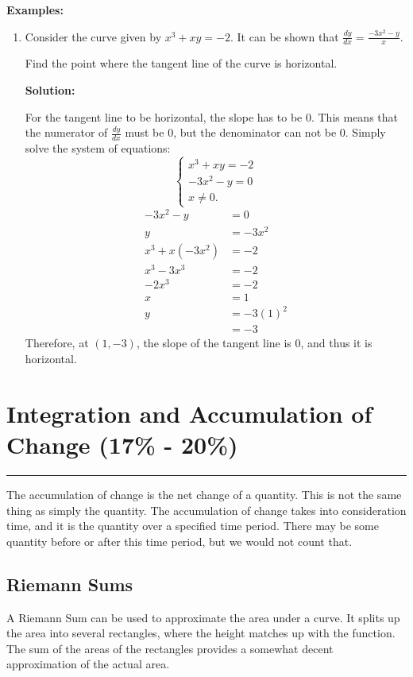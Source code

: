 \documentclass[12pt]{article}
\newcommand{\fline}{\par\noindent\rule{\textwidth}{0.1pt}} %
\begin{document}
\noindent \textbf{Examples:}
\begin{enumerate}
    \item Consider the curve given by $x^3 + xy = -2$. It can be shown that $\frac{dy}{dx} = \frac{-3x^2 - y}{x}$.

          Find the point where the tangent line of the curve is horizontal.
          \bigskip

          \textbf{Solution:}

          For the tangent line to be horizontal, the slope has to be $0$. This means that the numerator of $\frac{dy}{dx}$ must be $0$, but the denominator can not be $0$. Simply solve the system of equations:
          \[ \begin{cases}
                  x^3 + xy = -2 \\
                  -3x^2 - y = 0 \\
                  x \ne 0.
              \end{cases} \]
          \begin{align*}
              -3x^2 - y      & = 0       \\
              y              & = -3x^2   \\[6pt]
              x^3 + x(-3x^2) & = -2      \\
              x^3 - 3x^3     & = -2      \\
              -2x^3          & = -2      \\
              x              & = 1       \\[6pt]
              y              & = -3(1)^2 \\
                             & = -3
          \end{align*}
          Therefore, at $(1, -3)$, the slope of the tangent line is $0$, and thus it is horizontal.
\end{enumerate}

\section{Integration and Accumulation of Change (17\% - 20\%)}
\fline

The accumulation of change is the net change of a quantity. This is not the same thing as simply the quantity. The accumulation of change takes into consideration time, and it is the quantity over a specified time period. There may be some quantity before or after this time period, but we would not count that.

\subsection{Riemann Sums}
A Riemann Sum can be used to approximate the area under a curve. It splits up the area into several rectangles, where the height matches up with the function. The sum of the areas of the rectangles provides a somewhat decent approximation of the actual area.
\end{document}
